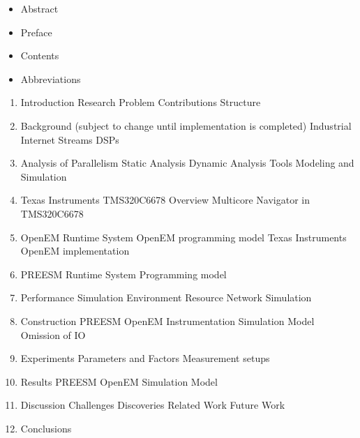 \begin{itemize}
\item Abstract
\item Preface
\item Contents
\item Abbreviations
\end{itemize}

\begin{enumerate}
\item Introduction
  \subitem Research Problem
  \subitem Contributions
  \subitem Structure

\item Background (subject to change until implementation is completed)
  \subitem Industrial Internet
  \subitem Streams
  \subitem DSPs

\item Analysis of Parallelism
  \subitem Static Analysis
  \subitem Dynamic Analysis
  \subitem Tools
  \subitem Modeling and Simulation

\item Texas Instruments TMS320C6678
  \subitem Overview
  \subitem Multicore Navigator in TMS320C6678

\item OpenEM
  \subitem Runtime System
  \subitem OpenEM programming model
  \subitem Texas Instruments OpenEM implementation

\item PREESM
  \subitem Runtime System
  \subitem Programming model

\item Performance Simulation Environment
  \subitem Resource Network Simulation

\item Construction
  \subitem PREESM
  \subitem OpenEM
  \subitem Instrumentation
  \subitem Simulation Model
  \subitem Omission of IO

\item Experiments
  \subitem Parameters and Factors
  \subitem Measurement setups

\item Results
  \subitem PREESM
  \subitem OpenEM
  \subitem Simulation Model

\item Discussion
  \subitem Challenges
  \subitem Discoveries
  \subitem Related Work
  \subitem Future Work
\item Conclusions
\end{enumerate}